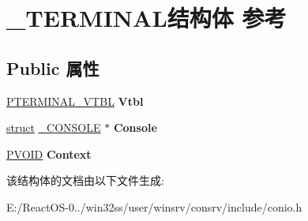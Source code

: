 \hypertarget{struct___t_e_r_m_i_n_a_l}{}\section{\+\_\+\+T\+E\+R\+M\+I\+N\+A\+L结构体 参考}
\label{struct___t_e_r_m_i_n_a_l}
\subsection*{Public 属性}
\begin{DoxyCompactItemize}
\item 
\mbox{\label{struct___t_e_r_m_i_n_a_l_a54f5cd5087611a8a0d513b545f99d6db}} 
\hyperlink{struct___t_e_r_m_i_n_a_l___v_t_b_l}{P\+T\+E\+R\+M\+I\+N\+A\+L\+\_\+\+V\+T\+BL} {\bfseries Vtbl}
\item 
\mbox{\label{struct___t_e_r_m_i_n_a_l_aa0c132061ff238679cefb307a0f80e02}} 
\hyperlink{interfacestruct}{struct} \hyperlink{struct___c_o_n_s_o_l_e}{\+\_\+\+C\+O\+N\+S\+O\+LE} $\ast$ {\bfseries Console}
\item 
\mbox{\label{struct___t_e_r_m_i_n_a_l_a2b0b1c88a247a9c573ec5f681aea090b}} 
\hyperlink{interfacevoid}{P\+V\+O\+ID} {\bfseries Context}
\end{DoxyCompactItemize}


该结构体的文档由以下文件生成\+:\begin{DoxyCompactItemize}
\item 
E\+:/\+React\+O\+S-\/0../win32ss/user/winsrv/consrv/include/conio.\+h\end{DoxyCompactItemize}
